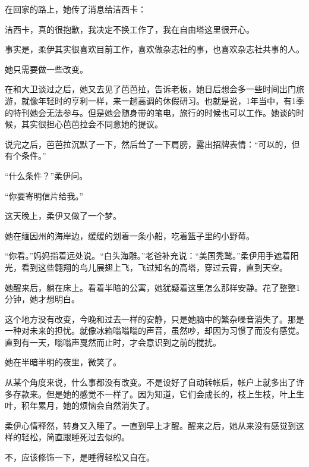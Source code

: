 在回家的路上，她传了消息给洁西卡：

{\kaishu 洁西卡，真的很抱歉，我决定不换工作了，我在自由塔这里很开心。}

事实是，柔伊其实很喜欢目前工作，喜欢做杂志社的事，也喜欢杂志社共事的人。

她只需要做一些改变。

在和大卫谈过之后，她又去见了芭芭拉，告诉老板，她日后想会多一些时间出门旅游，就像年轻时的亨利一样，来一趟高调的休假研习。也就是说，1年当中，有1季的特刊她会无法参与。但是她会随身带的笔电，旅行的时候也可以工作。她谈的时候，其实很担心芭芭拉会不同意她的提议。

说完之后，芭芭拉沉默了一下，然后耸了一下肩膀，露出招牌表情：“可以的，但有个条件。”

“什么条件？”柔伊问。

“你要寄明信片给我。”

这天晚上，柔伊又做了一个梦。

她在缅因州的海岸边，缓缓的划着一条小船，吃着篮子里的小野莓。

“你看。”妈妈指着远处说。“白头海雕。”老爸补充说：“美国秃鹫。”柔伊用手遮着阳光，看到这些翱翔的鸟儿展翅上飞，飞过知名的高塔，穿过云霄，直到天空。

她醒来后，躺在床上。看着半暗的公寓，她犹疑着这里怎么那样安静。花了整整1分钟，她才想明白。

这个地方没有改变，今晚和过去一样的安静，只是她脑中的繁杂噪音消失了。那是一种对未来的担忧。就像冰箱嗡嗡嗡的声音，虽然吵，却因为习惯了而没有感觉。直到有一天，嗡嗡声戛然而止时，才会意识到之前的搅扰。

她在半暗半明的夜里，微笑了。

从某个角度来说，什么事都没有改变。不是设好了自动转帐后，帐户上就多出了许多存款来。但是她的感觉不一样了。因为知道，它们会成长的，枝上生枝，叶上生叶，积年累月，她的烦恼会自然消失了。

柔伊心情释然，转身又入睡了。一直到早上才醒。醒来之后，她从来没有感觉到这样的轻松，简直跟睡死过去似的。

不，应该修饰一下，是睡得轻松又自在。
